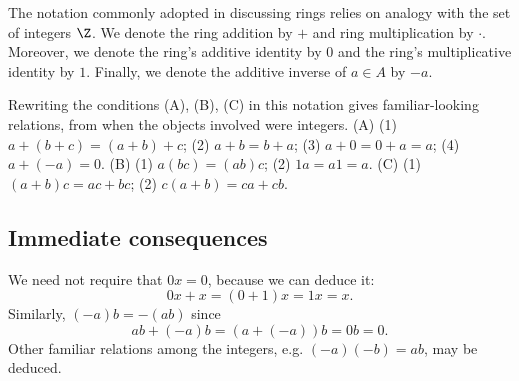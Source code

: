 The notation commonly adopted in discussing rings relies on analogy with the set of integers $\Z $.
We denote the ring addition by $+$ and ring multiplication by $\cdot $.
Moreover, we denote the ring's additive identity by $0$ and the ring's multiplicative identity by $1$.
Finally, we denote the additive inverse of $a \in A$ by $-a$.

Rewriting the conditions (A), (B), (C) in this notation gives familiar-looking relations, from when the objects involved were integers.
(A) (1) $a+(b + c) = (a+b)+c$; (2) $a+b = b+a$; (3) $a + 0 = 0 + a = a$; (4) $a + (-a) = 0$.
(B) (1) $a(bc) = (ab)c$; (2) $1a = a1 = a$.
(C) (1) $(a+b)c = ac + bc$; (2) $c(a+b) = ca + cb$.

\subsection*{Immediate consequences}

We need not require that $0x = 0$, because we can deduce it:
    \[
0x + x = (0 + 1)x = 1x = x.
    \]
Similarly, $(-a)b = -(ab)$ since
    \[
ab + (-a)b = (a + (-a))b = 0b = 0.
    \]
Other familiar relations among the integers, e.g. $(-a)(-b) = ab$, may be deduced.
